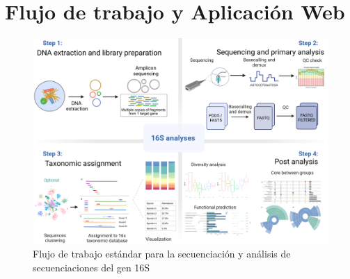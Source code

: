 \chapter{Flujo de trabajo y Aplicación Web}

\begin{figure}[H]
    \centering
    \includegraphics[width=1\linewidth]{images/16s_workflow_schema.jpeg}
    \caption{Flujo de trabajo estándar para la secuenciación y análisis de secuenciaciones del gen 16S}
    \label{fig:16S_workflow}
\end{figure}
